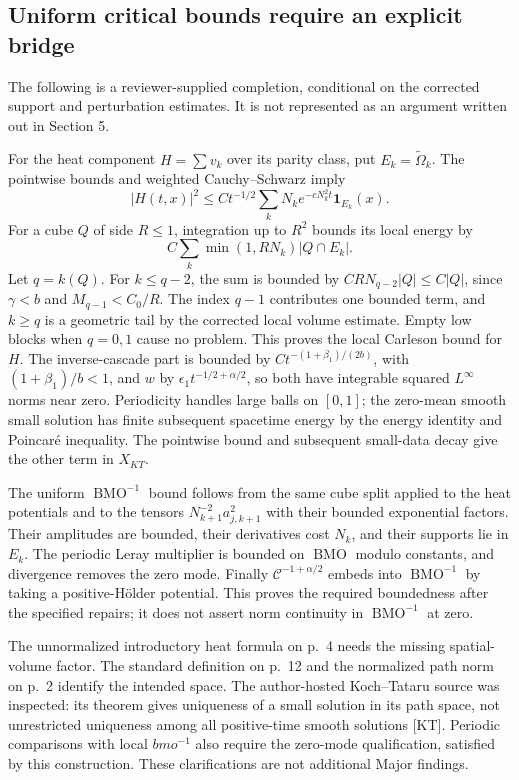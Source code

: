 \documentclass[10pt]{article}
\begin{document}
\subsection*{Uniform critical bounds require an explicit bridge}
The following is a reviewer-supplied completion, conditional on the corrected support and perturbation estimates. It is not represented as an argument written out in Section 5.\par
For the heat component \(H=\sum v_k\) over its parity class, put \(E_k=\widetilde\Omega_k\). The pointwise bounds and weighted Cauchy–Schwarz imply \[|H(t,x)|^2\leq Ct^{-1/2}
          \sum_kN_ke^{-cN_k^2t}\mathbf1_{E_k}(x).\] For a cube \(Q\) of side \(R\leq1\), integration up to \(R^2\) bounds its local energy by \[C\sum_k\min(1,RN_k)|Q\cap E_k|.\] Let \(q=k(Q)\). For \(k\leq q-2\), the sum is bounded by \(CRN_{q-2}|Q|\leq C|Q|\), since \(\gamma<b\) and \(M_{q-1}<C_0/R\). The index \(q-1\) contributes one bounded term, and \(k\geq q\) is a geometric tail by the corrected local volume estimate. Empty low blocks when \(q=0,1\) cause no problem. This proves the local Carleson bound for \(H\). The inverse-cascade part is bounded by \(Ct^{-(1+\beta_1)/(2b)}\), with \((1+\beta_1)/b<1\), and \(w\) by \(\epsilon_1t^{-1/2+\alpha/2}\), so both have integrable squared \(L^\infty\) norms near zero. Periodicity handles large balls on \([0,1]\); the zero-mean smooth small solution has finite subsequent spacetime energy by the energy identity and Poincaré inequality. The pointwise bound and subsequent small-data decay give the other term in \(X_{KT}\).\par
The uniform \(\operatorname{BMO}^{-1}\) bound follows from the same cube split applied to the heat potentials and to the tensors \(N_{k+1}^{-2}a_{j,k+1}^2\) with their bounded exponential factors. Their amplitudes are bounded, their derivatives cost \(N_k\), and their supports lie in \(E_k\). The periodic Leray multiplier is bounded on \(\operatorname{BMO}\) modulo constants, and divergence removes the zero mode. Finally \(\mathcal C^{-1+\alpha/2}\) embeds into \(\operatorname{BMO}^{-1}\) by taking a positive-Hölder potential. This proves the required boundedness after the specified repairs; it does not assert norm continuity in \(\operatorname{BMO}^{-1}\) at zero.\par
The unnormalized introductory heat formula on p. 4 needs the missing spatial-volume factor. The standard definition on p. 12 and the normalized path norm on p. 2 identify the intended space. The author-hosted Koch–Tataru source was inspected: its theorem gives uniqueness of a small solution in its path space, not unrestricted uniqueness among all positive-time smooth solutions [KT]. Periodic comparisons with local \(bmo^{-1}\) also require the zero-mode qualification, satisfied by this construction. These clarifications are not additional Major findings.\par
\end{document}
